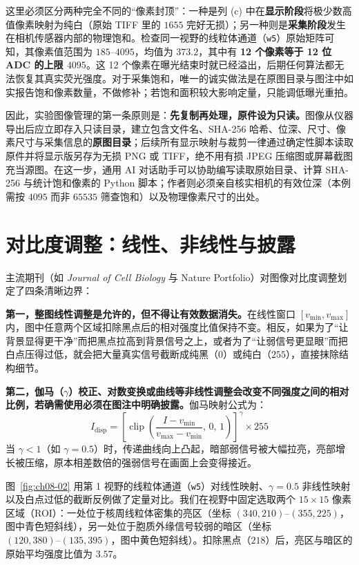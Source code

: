 这里必须区分两种完全不同的“像素封顶”：一种是列 (c) 中在\textbf{显示阶段}将极少数高值像素映射为纯白（原始 TIFF 里的 $1655$ 完好无损）；另一种则是\textbf{采集阶段}发生在相机传感器内部的物理饱和。检查同一视野的线粒体通道（\texttt{w5}）原始矩阵可知，其像素值范围为 $185\text{--}4095$，均值为 $373.2$，其中有 \textbf{12 个像素等于 12 位 ADC 的上限 $4095$}。这 12 个像素在曝光结束时就已经溢出，后期任何算法都无法恢复其真实荧光强度。对于采集饱和，唯一的诚实做法是在原图目录与图注中如实报告饱和像素数量，不做修补；若饱和面积较大影响定量，只能调低曝光重拍。

因此，实验图像管理的第一条原则是：\textbf{先复制再处理，原件设为只读。}图像从仪器导出后应立即存入只读目录，建立包含文件名、SHA-256 哈希、位深、尺寸、像素尺寸与采集信息的\textbf{原图目录}；后续所有显示映射与裁剪一律通过确定性脚本读取原件并将显示版另存为无损 PNG 或 TIFF，绝不用有损 JPEG 压缩图或屏幕截图充当源图。在这一步，通用 AI 对话助手可以协助编写读取原始目录、计算 SHA-256 与统计饱和像素的 Python 脚本；作者则必须亲自核实相机的有效位深（本例需按 $4095$ 而非 $65535$ 筛查饱和）以及物理像素尺寸的出处。

\section{对比度调整：线性、非线性与披露}

主流期刊（如 \textit{Journal of Cell Biology} 与 Nature Portfolio）对图像对比度调整划定了四条清晰边界：

\textbf{第一，整图线性调整是允许的，但不得让有效数据消失。}在线性窗口 $[v_{\min}, v_{\max}]$ 内，图中任意两个区域扣除黑点后的相对强度比值保持不变。相反，如果为了“让背景显得更干净”而把黑点拉高到背景信号之上，或者为了“让弱信号更显眼”而把白点压得过低，就会把大量真实信号截断成纯黑（$0$）或纯白（$255$），直接抹除结构细节。

\textbf{第二，伽马（$\gamma$）校正、对数变换或曲线等非线性调整会改变不同强度之间的相对比例，若确需使用必须在图注中明确披露。}伽马映射公式为：
\[
I_{\text{disp}} = \left[\operatorname{clip}\!\left(\frac{I - v_{\min}}{v_{\max} - v_{\min}},\, 0,\, 1\right)\right]^{\gamma} \times 255
\]
当 $\gamma < 1$（如 $\gamma = 0.5$）时，传递曲线向上凸起，暗部弱信号被大幅拉亮，亮部增长被压缩，原本相差数倍的强弱信号在画面上会变得接近。

图~\ref{fig:ch08-02} 用第 1 视野的线粒体通道（\texttt{w5}）对线性映射、$\gamma = 0.5$ 非线性映射以及白点过低的截断反例做了定量对比。我们在视野中固定选取两个 $15 \times 15$ 像素区域（ROI）：一处位于核周线粒体密集的亮区（坐标 $(340, 210)\text{--}(355, 225)$，图中青色短斜线），另一处位于胞质外缘信号较弱的暗区（坐标 $(120, 380)\text{--}(135, 395)$，图中黄色短斜线）。扣除黑点（$218$）后，亮区与暗区的原始平均强度比值为 $3.57$。

